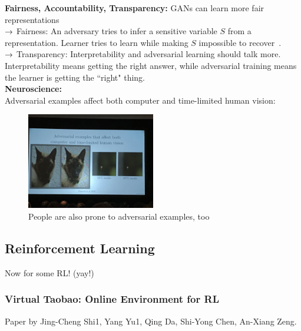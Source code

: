 {\bf Fairness, Accountability, Transparency:} GANs can learn more fair representations \\

$\rightarrow$ Fairness: An adversary tries to infer a sensitive variable $S$ from a representation. Learner tries to learn while making $S$ impossible to recover~\cite{edwards2015censoring}. \\

$\rightarrow$ Transparency: Interpretability and adversarial learning should talk more. Interpretability means getting the right answer, while adversarial training means the learner is getting the ``right" thing. \\

{\bf Neuroscience:} \\

Adversarial examples affect both computer and time-limited human vision:

\begin{figure}
    \centering
    \includegraphics[width=0.5\textwidth]{images/dog.JPG}
    \caption{People are also prone to adversarial examples, too}
    \label{fig:dog}
\end{figure}

\spacerule


\subsection{Reinforcement Learning}

Now for some RL! (yay!) \\

\subsubsection{Virtual Taobao: Online Environment for RL~\cite{shi2018virtual}}

Paper by Jing-Cheng Shi1, Yang Yu1, Qing Da, Shi-Yong Chen, An-Xiang Zeng. \\


